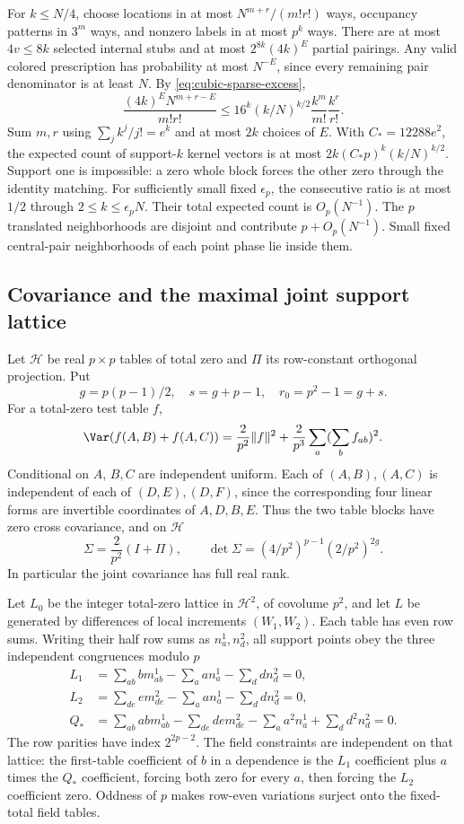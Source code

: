 For $k\le N/4$, choose locations in at most $N^{m+r}/(m!r!)$
ways, occupancy patterns in $3^m$ ways, and nonzero labels in at
most $p^k$ ways. There are at most $4v\le8k$ selected internal
stubs and at most $2^{8k}(4k)^E$ partial pairings. Any valid colored
prescription has probability at most $N^{-E}$, since every remaining
pair denominator is at least $N$. By \eqref{eq:cubic-sparse-excess},
\[
 \frac{(4k)^EN^{m+r-E}}{m!r!}
 \le16^k(k/N)^{k/2}\frac{k^m}{m!}\frac{k^r}{r!}.
\]
Sum $m,r$ using $\sum_jk^j/j!=e^k$ and at most $2k$ choices
of $E$. With $C_*=12288e^2$, the expected count of support-$k$
kernel vectors is at most
$2k(C_*p)^k(k/N)^{k/2}$. Support one is impossible: a zero whole
block forces the other zero through the identity matching.
For sufficiently small fixed $\epsilon_p$, the consecutive ratio
is at most $1/2$ through $2\le k\le\epsilon_pN$.
Their total expected count is $O_p(N^{-1})$.
The $p$ translated neighborhoods are disjoint and contribute
$p+O_p(N^{-1})$. Small fixed central-pair neighborhoods of each
point phase lie inside them.

\subsection{Covariance and the maximal joint support lattice}
Let $\mathcal H$ be real $p\times p$ tables of total zero and
$\Pi$ its row-constant orthogonal projection. Put
\[
 g=p(p-1)/2,\quad s=g+p-1,\quad r_0=p^2-1=g+s.
\]
For a total-zero test table $f$,
\[
 \Var(f(A,B)+f(A,C))
 =\frac2{p^2}\|f\|^2+\frac2{p^3}\sum_a(\sum_bf_{ab})^2.
\]
Conditional on $A$, $B,C$ are independent uniform. Each of
$(A,B),(A,C)$ is independent of each of $(D,E),(D,F)$, since the
corresponding four linear forms are invertible coordinates of
$A,D,B,E$. Thus the two table blocks have zero cross covariance,
and on $\mathcal H$
\begin{equation}\label{eq:cubic-covariance}
 \Sigma=\frac2{p^2}(I+\Pi),\qquad
 \det\Sigma=(4/p^2)^{p-1}(2/p^2)^{2g}.
\end{equation}
In particular the joint covariance has full real rank.

Let $L_0$ be the integer total-zero lattice in $\mathcal H^2$,
of covolume $p^2$, and let $L$ be generated by differences of
local increments $(W_1,W_2)$. Each table has even row sums.
Writing their half row sums as $n^1_a,n^2_d$, all support points obey
the three independent congruences modulo $p$
\begin{align*}
 L_1&=\sum_{ab}b m^1_{ab}-\sum_a a n^1_a-\sum_d d n^2_d=0,\\
 L_2&=\sum_{de}e m^2_{de}-\sum_a a n^1_a-\sum_d d n^2_d=0,\\
 Q_*&=\sum_{ab}ab m^1_{ab}-\sum_{de}de m^2_{de}
                  -\sum_a a^2n^1_a+\sum_d d^2n^2_d=0.
\end{align*}
The row parities have index $2^{2p-2}$. The field constraints are
independent on that lattice: the first-table coefficient of $b$
in a dependence is the $L_1$ coefficient plus $a$ times the $Q_*$
coefficient, forcing both zero for every $a$, then forcing the
$L_2$ coefficient zero. Oddness of $p$ makes row-even variations
surject onto the fixed-total field tables.

